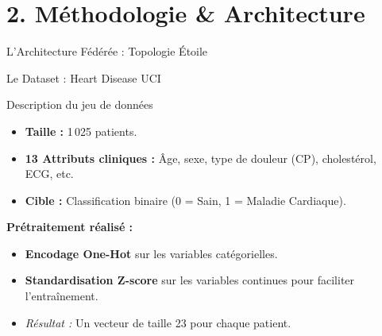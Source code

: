 \documentclass[aspectratio=169,11pt]{beamer}
\begin{document}
\section{2. M\'{e}thodologie \& Architecture}

\begin{frame}{L'Architecture F\'{e}d\'{e}r\'{e}e : Topologie \'{E}toile}
  \begin{figure}
    \centering
  \end{figure}
\end{frame}

\begin{frame}{Le Dataset : Heart Disease UCI}
  \begin{block}{Description du jeu de donn\'{e}es}
    \begin{itemize}
      \item \textbf{Taille :} 1\,025 patients.
      \item \textbf{13 Attributs cliniques :} \^{A}ge, sexe, type de douleur (CP), cholest\'{e}rol, ECG, etc.
      \item \textbf{Cible :} Classification binaire (0 = Sain, 1 = Maladie Cardiaque).
    \end{itemize}
  \end{block}
  \vspace{0.2cm}
  
  \textbf{Pr\'{e}traitement r\'{e}alis\'{e} :}
  \begin{itemize}
    \item \textbf{Encodage One-Hot} sur les variables cat\'{e}gorielles.
    \item \textbf{Standardisation Z-score} sur les variables continues pour faciliter l'entra\^{i}nement.
    \item \emph{R\'{e}sultat :} Un vecteur de taille 23 pour chaque patient.
  \end{itemize}
\end{frame}
\end{document}
